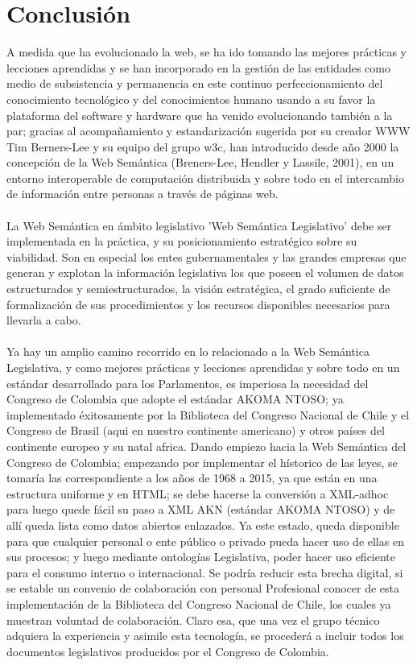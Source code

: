 \documentclass[conference]{IEEEtran}
\begin{document}
\section{Conclusión}
   A medida que ha evolucionado la web, se ha ido tomando las mejores prácticas y lecciones aprendidas y se han incorporado en la gestión de las entidades como medio de subsistencia y permanencia en este continuo perfeccionamiento del conocimiento tecnológico y del conocimientos humano usando a su favor la plataforma del software y hardware que ha venido evolucionando también a la par; gracias al acompañamiento y estandarización sugerida por su creador WWW Tim Berners-Lee y su equipo del grupo w3c, han introducido desde año 2000 la concepción de la Web Semántica (Breners-Lee, Hendler y Lassile, 2001), en un entorno interoperable de computación distribuida y sobre todo en el intercambio de información entre personas a través de páginas web.\\ \\
   La Web Semántica en ámbito legislativo 'Web Semántica Legislativo' debe ser implementada en la práctica, y su posicionamiento estratégico sobre su viabilidad. Son en especial los entes gubernamentales y las grandes empresas que generan y explotan la información legislativa los que poseen el volumen de datos estructurados y semiestructurados, la visión estratégica, el grado suficiente de formalización de sus procedimientos y los recursos disponibles necesarios para llevarla a cabo.\\ \\
   Ya hay un amplio camino recorrido en lo relacionado a la Web Semántica Legislativa, y como mejores prácticas y lecciones aprendidas y sobre todo en un estándar desarrollado para los Parlamentos, es imperiosa la necesidad del Congreso de Colombia que adopte el estándar AKOMA NTOSO; ya implementado éxitosamente por la Biblioteca del Congreso Nacional de Chile y el Congreso de Brasil (aqui en nuestro continente americano) y otros países del continente europeo y su natal africa. Dando empiezo hacia la Web Semántica del Congreso de Colombia; empezando por implementar el hístorico de las leyes, se tomaría las correspondiente a los años de 1968 a 2015, ya que están en una estructura uniforme y en HTML; se debe hacerse la conversión a XML-adhoc para luego quede fácil su paso a XML AKN (estándar AKOMA NTOSO) y de allí queda lista como datos abiertos enlazados. Ya este estado, queda disponible para que cualquier personal o ente público o privado pueda hacer uso de ellas en sus procesos; y luego mediante ontologías Legislativa, poder hacer uso eficiente para el consumo interno o internacional. Se podría reducir esta brecha digital, si se estable un convenio de colaboración con personal Profesional conocer de esta implementación de la Biblioteca del Congreso Nacional de Chile, los cuales ya muestran voluntad de colaboración. Claro esa, que una vez el grupo técnico adquiera la experiencia y asimile esta tecnología, se procederá a incluir todos los documentos legislativos producidos por el Congreso de Colombia.
\end{document}
